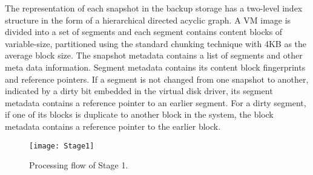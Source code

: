 The representation of each snapshot in the backup storage
has a two-level index structure in the form of a hierarchical
directed acyclic graph.%
A VM image is divided into a set of segments and each  segment contains 
content blocks of variable-size, partitioned using
the standard chunking technique with 4KB as the average block size. 
The snapshot metadata  contains a list of segments and other meta data information.
Segment metadata  contains its  content block fingerprints and reference pointers. 
If a segment is not changed from one snapshot to another, indicated by a dirty bit embedded in the virtual disk driver, 
its segment metadata contains a reference pointer to an earlier segment.
For a dirty segment, if one of its blocks is duplicate to another block in the system,  
the block metadata contains a reference pointer to the earlier block.






\begin{figure}[th]
\centering
\texttt{[image: Stage1]}
\caption{Processing flow of Stage 1.}
\label{fig:stage1}
\end{figure}

